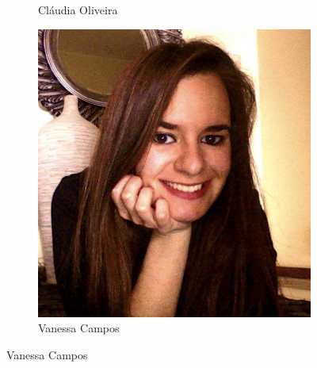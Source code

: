 \documentclass[11pt, a4paper, oneside]{article}
\begin{document}
\begin{figure}[h!]
\begin{subfigure}{.33\textwidth}
  \caption{Cláudia Oliveira}
\end{subfigure}%
\begin{subfigure}{.33\textwidth}
  \centering
  \includegraphics[width=0.8\linewidth]{93}
  \caption{Vanessa Campos}
\end{subfigure}%
\end{figure}
\end{document}
